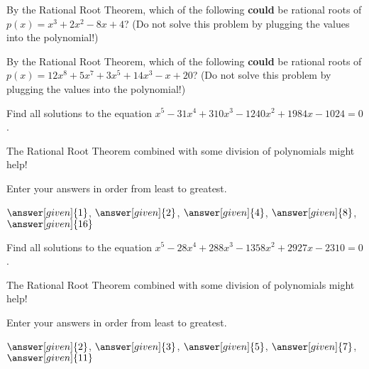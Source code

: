 \documentclass[nooutcomes]{ximera}
\begin{document}
\begin{problem}
By the Rational Root Theorem, which of the following \textbf{could} be rational roots of $p(x) = x^3 + 2x^2 - 8x + 4$?   
(Do not solve this problem by plugging the values into the polynomial!)
\begin{selectAll}
\end{selectAll}
\end{problem}




\begin{problem}
By the Rational Root Theorem, which of the following \textbf{could} be rational roots of $p(x) = 12x^8 + 5x^7 + 3x^5 + 14x^3 - x + 20$?
(Do not solve this problem by plugging the values into the polynomial!)
\begin{selectAll}
\end{selectAll}
\end{problem}



\begin{problem}
Find all solutions to the equation $x^5-31x^4+310x^3-1240x^2+1984x-1024=0$. 
\begin{hint} 
The Rational Root Theorem combined with some division of polynomials might help!
\end{hint}
Enter your answers in order from least to greatest.

\begin{prompt}
$\answer[given]{1}$, $\answer[given]{2}$, $\answer[given]{4}$, $\answer[given]{8}$, $\answer[given]{16}$
\end{prompt}
\end{problem}


\begin{problem}
Find all solutions to the equation $x^5-28x^4+288x^3-1358x^2+2927x-2310=0$. 
\begin{hint} 
The Rational Root Theorem combined with some division of polynomials might help!
\end{hint}
Enter your answers in order from least to greatest.

\begin{prompt}
$\answer[given]{2}$, $\answer[given]{3}$, $\answer[given]{5}$, $\answer[given]{7}$, $\answer[given]{11}$
\end{prompt}
\end{problem}
\end{document}
